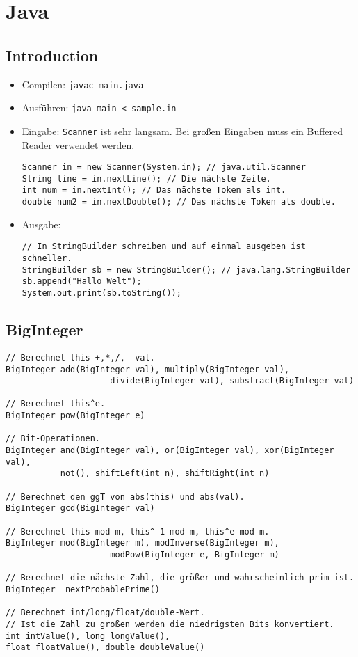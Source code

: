 \section{Java}
\lstset{language=Java}

\subsection{Introduction}

\begin{itemize}[nosep]
	\item Compilen: \lstinline{javac main.java}
	\item Ausführen: \lstinline{java main < sample.in}
	\item Eingabe:
	\lstinline{Scanner} ist sehr langsam.
	Bei großen Eingaben muss ein Buffered Reader verwendet werden.
	\begin{lstlisting}
Scanner in = new Scanner(System.in); // java.util.Scanner
String line = in.nextLine(); // Die nächste Zeile.
int num = in.nextInt(); // Das nächste Token als int.
double num2 = in.nextDouble(); // Das nächste Token als double.
	\end{lstlisting}
	\item Ausgabe:
	\begin{lstlisting}
// In StringBuilder schreiben und auf einmal ausgeben ist schneller.
StringBuilder sb = new StringBuilder(); // java.lang.StringBuilder
sb.append("Hallo Welt");
System.out.print(sb.toString());
	\end{lstlisting}
\end{itemize}

\subsection{BigInteger}
\begin{lstlisting}
// Berechnet this +,*,/,- val.
BigInteger add(BigInteger val), multiply(BigInteger val),
					 divide(BigInteger val), substract(BigInteger val)

// Berechnet this^e.
BigInteger pow(BigInteger e)

// Bit-Operationen.
BigInteger and(BigInteger val), or(BigInteger val), xor(BigInteger val),
           not(), shiftLeft(int n), shiftRight(int n)

// Berechnet den ggT von abs(this) und abs(val).
BigInteger gcd(BigInteger val)

// Berechnet this mod m, this^-1 mod m, this^e mod m.
BigInteger mod(BigInteger m), modInverse(BigInteger m),
					 modPow(BigInteger e, BigInteger m)

// Berechnet die nächste Zahl, die größer und wahrscheinlich prim ist.
BigInteger  nextProbablePrime()

// Berechnet int/long/float/double-Wert.
// Ist die Zahl zu großen werden die niedrigsten Bits konvertiert.
int intValue(), long longValue(),
float floatValue(), double doubleValue() 
\end{lstlisting}
\lstset{language=C++}